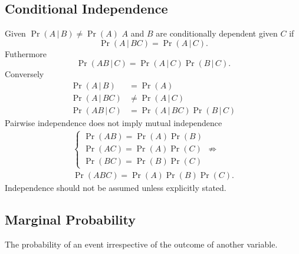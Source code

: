 \documentclass{article}
\begin{document}
\begin{multicols}{3}
    \subsection{Conditional Independence}
    Given \(\Pr{\left( A \,\vert\, B \right)} \neq \Pr{\left( A \right)}\)
    \(A\) and \(B\) are conditionally dependent given \(C\) if
    \begin{equation*}
        \Pr{\left( A \,\vert\, BC \right)} = \Pr{\left( A \,\vert\, C \right)}.
    \end{equation*}
    Futhermore
    \begin{equation*}
        \Pr{\left( AB \,\vert\, C \right)} = \Pr{\left( A \,\vert\, C \right)} \Pr{\left( B \,\vert\, C \right)}.
    \end{equation*}
    Conversely
    \begin{align*}
        \Pr{\left( A \,\vert\, B \right)}  & = \Pr{\left( A \right)}                                                \\
        \Pr{\left( A \,\vert\, BC \right)} & \neq \Pr{\left( A \,\vert\, C \right)}                                 \\
        \Pr{\left( AB \,\vert\, C \right)} & = \Pr{\left( A \,\vert\, BC \right)} \Pr{\left( B \,\vert\, C \right)}
    \end{align*}
    Pairwise independence does not imply mutual independence
    \begin{gather*}
        \begin{cases}
            \Pr{\left( A B \right)} = \Pr{\left( A \right)} \Pr{\left( B \right)} \\
            \Pr{\left( A C \right)} = \Pr{\left( A \right)} \Pr{\left( C \right)} \\
            \Pr{\left( B C \right)} = \Pr{\left( B \right)} \Pr{\left( C \right)}
        \end{cases} \not\Rightarrow                                                                          \\
        \Pr{\left( A B C \right)} = \Pr{\left( A \right)} \Pr{\left( B \right)} \Pr{\left( C \right)}.
    \end{gather*}
    Independence should not be assumed unless explicitly stated.
    \subsection{Marginal Probability}
    The probability of an event irrespective of the outcome of another variable.

\end{multicols}
\end{document}
